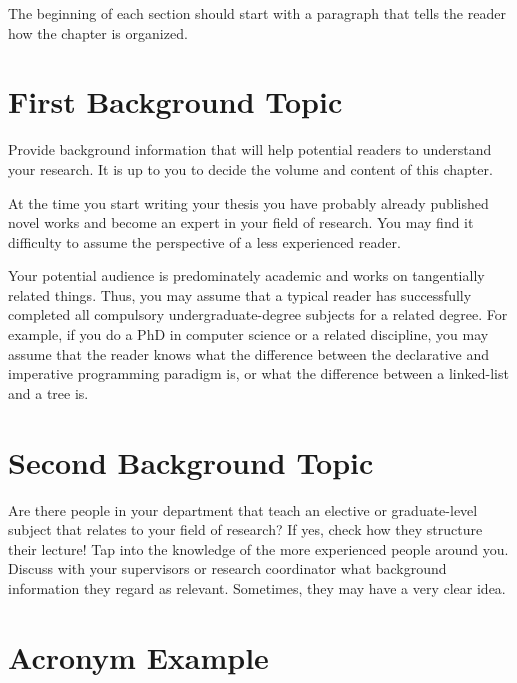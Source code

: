 
\noindent The beginning of each section should start with a paragraph that tells the reader how the chapter is organized.

\section{First Background Topic}
\label{s:First-Background-Topic}

Provide background information that will help potential readers to understand your research. It is up to you to decide the volume and content of this chapter.

At the time you start writing your thesis you have probably already published novel works and become an expert in your field of research. You may find it difficulty to assume the perspective of a less experienced reader.

Your potential audience is predominately academic and works on tangentially related things. Thus, you may assume that a typical reader has successfully completed all compulsory undergraduate-degree subjects for a related degree. For example, if you do a PhD in computer science or a related discipline, you may assume that the reader knows what the difference between the declarative and imperative programming paradigm is, or what the difference between a linked-list and a tree is.

\section{Second Background Topic}
\label{s:Second-Background-Topic}

Are there people in your department that teach an elective or graduate-level subject that relates to your field of research? If yes, check how they structure their lecture! Tap into the knowledge of the more experienced people around you. Discuss with your supervisors or research coordinator what background information they regard as relevant. Sometimes, they may have a very clear idea.


\section{Acronym Example}\label{sec:acro_example}

